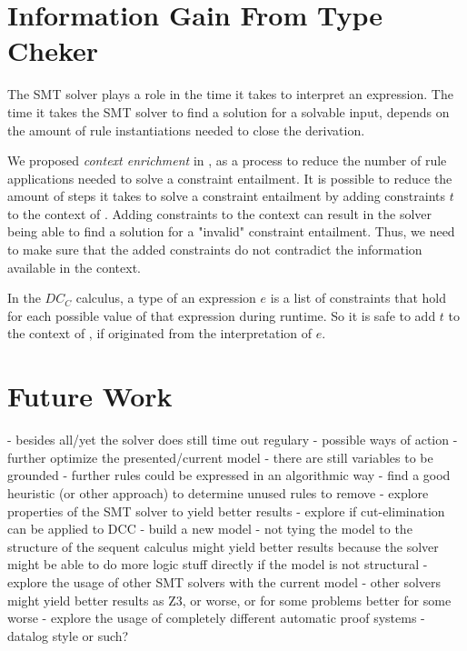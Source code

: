 \section{Information Gain From Type Cheker}
The SMT solver plays a role in the time it takes
to interpret an expression.
The time it takes the SMT solver to find a
solution for a solvable input, depends on the amount
of rule instantiations needed to close the derivation.

We proposed \textit{context enrichment} in ,
as a process to reduce the number of rule applications needed
to solve a constraint entailment.
It is possible to reduce the amount of steps it takes
to solve a constraint entailment 
by adding constraints $t$ to the context of .
Adding constraints to the context
can result in the solver being able to find a solution for
a "invalid" constraint entailment.
Thus, we need to make sure that the added constraints
do not contradict the information available in the context.

In the $DC_C$ calculus, a type of an expression $e$ is a list of constraints that
hold for each possible value of that expression during runtime.
So it is safe to add $t$ to the context of ,
if  originated from the interpretation of $e$.
%

\section{Future Work}
  - besides all/yet the solver does still time out regulary
  - possible ways of action
    - further optimize the presented/current model
      - there are still variables to be grounded
      - further rules could be expressed in an algorithmic way
      - find a good heuristic (or other approach) to determine unused rules to remove
      - explore properties of the SMT solver to yield better results
      - explore if cut-elimination can be applied to DCC
    - build a new model
      - not tying the model to the structure of the sequent calculus might yield better results
        because the solver might be able to do more logic stuff directly if the model is not structural
    - explore the usage of other SMT solvers with the current model
      - other solvers might yield better results as Z3,
        or worse, or for some problems better for some worse
    - explore the usage of completely different automatic proof systems
      - datalog style or such?


